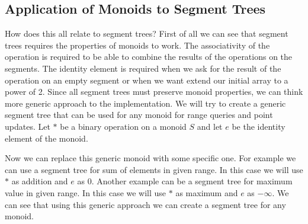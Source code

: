 \documentclass{article}
\begin{document}
\subsection{Application of Monoids to Segment Trees}
How does this all relate to segment trees?
First of all we can see that segment trees requires the properties of monoids to work.
The associativity of the operation is required to be able to combine the results of the operations on the segments.
The identity element is required when we ask for the result of the operation on an empty segment or 
when we want extend our initial array to a power of 2. 
Since all segment trees must preserve monoid properties, we can think more generic 
approach to the implementation. We will try to create a generic segment tree that can be used for any monoid for 
range queries and point updates. Let \(\ast\) be a binary operation on a monoid \(S\) and let \(e\) be the identity element of the monoid.


\vspace{0.1cm}
 
\vspace{0.1cm}
 
\FloatBarrier
Now we can replace this generic monoid with some specific one.
For example we can use a segment tree for sum of elements in given range.
In this case we will use \(\ast\) as addition and \(e\) as 0. 
Another example can be a segment tree for maximum value in given range.
In this case we will use \(\ast\) as maximum and \(e\) as \(-\infty\).
We can see that using this generic approach we can create a segment tree for any monoid.
\end{document}
